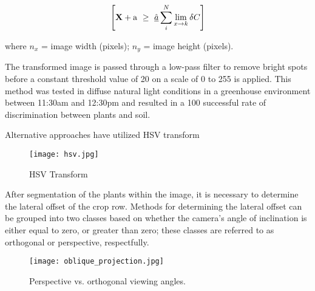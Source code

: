 \begin{equation}
  \left[
    {\bf X} + {\rm a} \ \geq\ 
    \underline{\hat a} \sum_i^N \lim_{x \rightarrow k} \delta C
  \right]
\end{equation}
\begin{flushleft}
where $n_{x}$ = image width (pixels); $n_{y}$ = image height (pixels).
\end{flushleft}

The transformed image is passed through a low-pass filter to remove
bright spots before a constant threshold value of 20 on a scale of 0
to 255 is applied. This method was tested in diffuse natural light
conditions in a greenhouse environment between 11:30am and 12:30pm and
resulted in a 100 successful rate of discrimination between plants and
soil.

Alternative approaches have utilized HSV transform

\begin{figure}
  \centering
  \texttt{[image: hsv.jpg]}
  \caption{HSV Transform}
  \label{fig:hsv}
\end{figure}

After segmentation of the plants within the image, it is necessary to
determine the lateral offset of the crop row. Methods for determining
the lateral offset can be grouped into two classes based on whether
the camera’s angle of inclination is either equal to zero, or greater
than zero; these classes are referred to as orthogonal or perspective,
respectfully. 

\begin{figure}
  \centering
  \texttt{[image: oblique\_projection.jpg]}
  \caption{Perspective vs. orthogonal viewing angles.}
  \label{fig:projection}
\end{figure}

